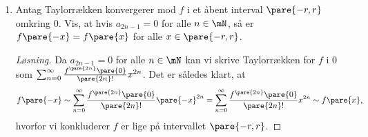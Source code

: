 \begin{opg}
\begin{enumerate}
    
    \item Antag Taylorrækken konvergerer mod $f$ i et åbent interval $\pare{-r,r}$ omkring $0$. Vis, at hvis $a_{2n-1} = 0$ for alle $n\in\mN$, så er $f\pare{-x} = f\pare{x}$ for alle $x\in\pare{-r,r}$.
    
    
    \begin{proof}[Løsning]
    Da $a_{2n-1} = 0$ for alle $n\in\mN$ kan vi skrive Taylorrækken for $f$ i $0$ som $\sum_{n=0}^\infty\frac{f^{\pare{2n}}\pare{0}}{\pare{2n}!}x^{2n}$. Det er således klart, at
    $$ f\pare{-x}
        \sim \sum_{n=0}^\infty
            \frac{f^{\pare{2n}}\pare{0}}{\pare{2n}!}\pare{-x}^{2n}
        = \sum_{n=0}^\infty
            \frac{f^{\pare{2n}}\pare{0}}{\pare{2n}!}x^{2n}
        \sim f\pare{x}, $$
    hvorfor vi konkluderer $f$ er lige på intervallet $\pare{-r,r}$.
    \end{proof}
    
\end{enumerate}
\end{opg}

